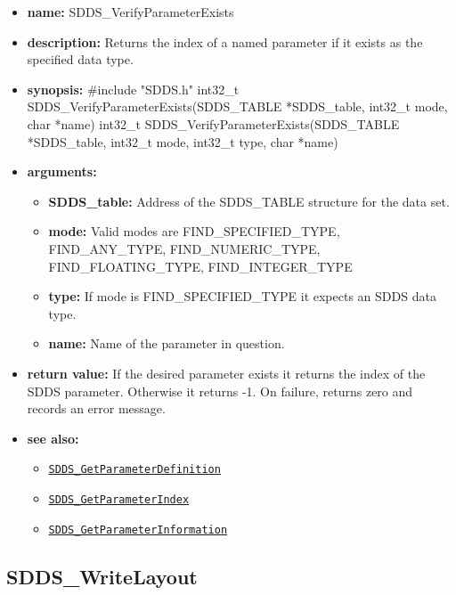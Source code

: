 \documentclass[11pt]{article}
\newcommand{\progref}[1]{\hyperref[SDDS_#1]{\tt SDDS\_#1}}
\begin{document}
\begin{itemize}
\item {\bf name:}\newline
SDDS\_VerifyParameterExists
\item {\bf description:}\newline
Returns the index of a named parameter if it exists as the specified data type.
\item {\bf synopsis:} \#include "SDDS.h"\newline
int32\_t SDDS\_VerifyParameterExists(SDDS\_TABLE *SDDS\_table, int32\_t mode, char *name)
int32\_t SDDS\_VerifyParameterExists(SDDS\_TABLE *SDDS\_table, int32\_t mode, int32\_t type, char *name)
\item {\bf arguments:}
\begin{itemize}
\item {\bf SDDS\_table:} Address of the SDDS\_TABLE structure for the data set.
\item {\bf mode:} Valid modes are FIND\_SPECIFIED\_TYPE, FIND\_ANY\_TYPE, FIND\_NUMERIC\_TYPE, FIND\_FLOATING\_TYPE, FIND\_INTEGER\_TYPE
\item {\bf type:} If mode is FIND\_SPECIFIED\_TYPE it expects an SDDS data type.
\item {\bf name:} Name of the parameter in question.
\end{itemize}
\item {\bf return value:}\newline
If the desired parameter exists it returns the index of the SDDS parameter. Otherwise it returns -1.\newline
\newline
On failure, returns zero and records an error message. 
\item {\bf see also:}
\begin{itemize}
\item \progref{GetParameterDefinition}
\item \progref{GetParameterIndex}
\item \progref{GetParameterInformation}
\end{itemize}
\end{itemize}

\subsection{SDDS\_WriteLayout}
\label{SDDS_WriteLayout}
\end{document}
